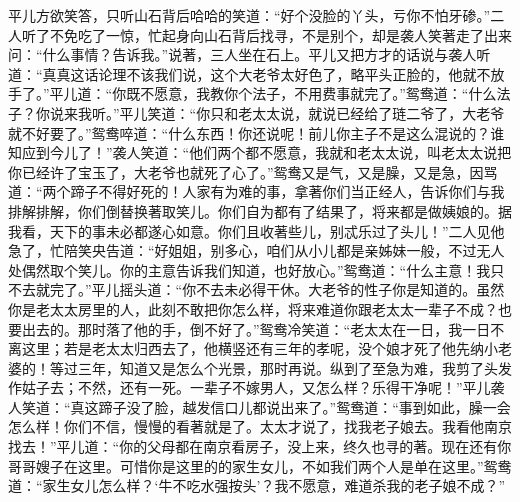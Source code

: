 \begin{parag}
    平儿方欲笑答，只听山石背后哈哈的笑道：“好个没脸的丫头，亏你不怕牙碜。”二人听了不免吃了一惊，忙起身向山石背后找寻，不是别个，却是袭人笑著走了出来问：“什么事情？告诉我。”说著，三人坐在石上。平儿又把方才的话说与袭人听道：“真真这话论理不该我们说，这个大老爷太好色了，略平头正脸的，他就不放手了。”平儿道：“你既不愿意，我教你个法子，不用费事就完了。”鸳鸯道：“什么法子？你说来我听。”平儿笑道：“你只和老太太说，就说已经给了琏二爷了，大老爷就不好要了。”鸳鸯啐道：“什么东西！你还说呢！前儿你主子不是这么混说的？谁知应到今儿了！”袭人笑道：“他们两个都不愿意，我就和老太太说，叫老太太说把你已经许了宝玉了，大老爷也就死了心了。”鸳鸯又是气，又是臊，又是急，因骂道：“两个蹄子不得好死的！人家有为难的事，拿著你们当正经人，告诉你们与我排解排解，你们倒替换著取笑儿。你们自为都有了结果了，将来都是做姨娘的。据我看，天下的事未必都遂心如意。你们且收著些儿，别忒乐过了头儿！”二人见他急了，忙陪笑央告道：“好姐姐，别多心，咱们从小儿都是亲姊妹一般，不过无人处偶然取个笑儿。你的主意告诉我们知道，也好放心。”鸳鸯道：“什么主意！我只不去就完了。”平儿摇头道：“你不去未必得干休。大老爷的性子你是知道的。虽然你是老太太房里的人，此刻不敢把你怎么样，将来难道你跟老太太一辈子不成？也要出去的。那时落了他的手，倒不好了。”鸳鸯冷笑道：“老太太在一日，我一日不离这里；若是老太太归西去了，他横竖还有三年的孝呢，没个娘才死了他先纳小老婆的！等过三年，知道又是怎么个光景，那时再说。纵到了至急为难，我剪了头发作姑子去；不然，还有一死。一辈子不嫁男人，又怎么样？乐得干净呢！”平儿袭人笑道：“真这蹄子没了脸，越发信口儿都说出来了。”鸳鸯道：“事到如此，臊一会怎么样！你们不信，慢慢的看著就是了。太太才说了，找我老子娘去。我看他南京找去！”平儿道：“你的父母都在南京看房子，没上来，终久也寻的著。现在还有你哥哥嫂子在这里。可惜你是这里的的家生女儿，不如我们两个人是单在这里。”鸳鸯道：“家生女儿怎么样？‘牛不吃水强按头’？我不愿意，难道杀我的老子娘不成？”
\end{parag}


